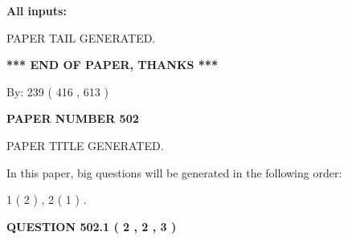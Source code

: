 \documentclass[12pt]{article}
\begin{document}
   
   
   
\noindent{}
   
   
   
   
\noindent\vspace{0.1in}\hspace{-0.08in} {\textbf{\Large{All inputs: }}}
   
   
   
   
   
   
 \vspace{0.2in}
 
   
   
\vspace{2.0in} PAPER TAIL GENERATED.
   
   
   
   
\vspace{1.0in} 
{\textbf{\large{ *** END OF PAPER, THANKS *** }}} 
   
   
\hspace{1.0in} By: 
 239 ( 416 ,  613 )
   
   
   
   
\newpage 
\setcounter{page}{ 
   502001 } 
   
   
   
   
 {\textbf{ \Large{ PAPER NUMBER  502  }}}
   
   
\vspace{0.2in}
   
   
   
   
   
   
   
   
 \vspace{0.2in}
 
 
 
 
   
   
 PAPER TITLE GENERATED.
   
   
   
\vspace{0.2in}
   
In this paper, big questions will be generated in the following order: 
   
   
   1 ( 2 )
 ,
   2 ( 1 )
 .
  
\vspace{0.2in}
  
{\textbf{\Large{QUESTION
502.1 
 ( 2 , 2 , 3 )
}}}
  
\end{document}

